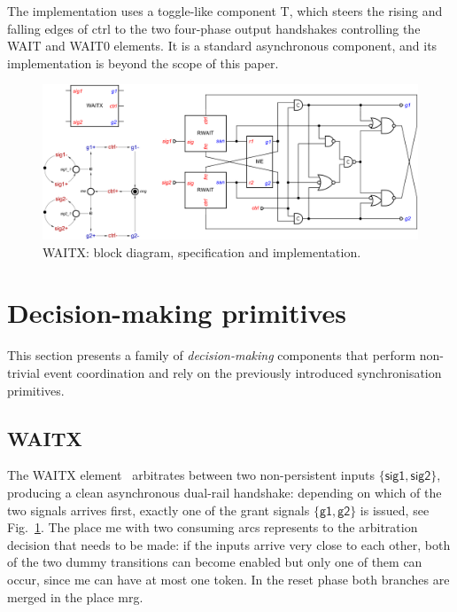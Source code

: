 \documentclass[conference]{IEEEtran}
\begin{document}
The implementation uses a toggle-like component \textsf{T}, which steers the rising and
falling edges of \textsf{ctrl} to the two four-phase output handshakes controlling
the \textsf{WAIT} and \textsf{WAIT0} elements. It is a standard
asynchronous component, and its implementation is beyond the scope of this paper.

\begin{figure}
\begin{center}
    \includegraphics[scale=0.23]{fig/WAITX.pdf}
    \vspace{-2mm}
    \caption{\textsf{WAITX}: block diagram, specification and implementation.}
    \label{fig:waitx}
    \vspace{-6mm}
\end{center}
\end{figure}

\section{Decision-making primitives}\label{sec-decision}

This section presents a family of \emph{decision-making} components that perform
non-trivial event coordination and rely on the previously introduced synchronisation
primitives.

\subsection*{\textsf{WAITX}}

The \textsf{WAITX} element~\cite{2017_khomenko_waitx} arbitrates between two
non-persistent inputs $\{\textsf{sig1}, \textsf{sig2}\}$, producing a clean
asynchronous dual-rail handshake: depending on which of the two signals arrives
first, exactly one of the grant signals $\{\textsf{g1}, \textsf{g2}\}$ is issued, see
Fig.~\ref{fig:waitx}. The place \textsf{me} with two consuming arcs represents to
the arbitration decision that needs to be made: if the inputs arrive very close to
each other, both of the two dummy transitions can become enabled but only one
of them can occur, since \textsf{me} can have at most one token. In the reset phase
both branches are merged in the place \textsf{mrg}.
\end{document}

